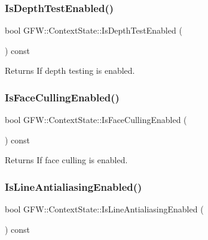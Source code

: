\subsubsection{\texorpdfstring{Is\+Depth\+Test\+Enabled()}{IsDepthTestEnabled()}}
{\footnotesize\ttfamily bool G\+F\+W\+::\+Context\+State\+::\+Is\+Depth\+Test\+Enabled (\begin{DoxyParamCaption}{ }\end{DoxyParamCaption}) const}

\begin{DoxyReturn}{Returns}
If depth testing is enabled. 
\end{DoxyReturn}
\mbox{\label{class_g_f_w_1_1_context_state_a805c41d30f739fd1a92a13fabe31aad4}} 
\subsubsection{\texorpdfstring{Is\+Face\+Culling\+Enabled()}{IsFaceCullingEnabled()}}
{\footnotesize\ttfamily bool G\+F\+W\+::\+Context\+State\+::\+Is\+Face\+Culling\+Enabled (\begin{DoxyParamCaption}{ }\end{DoxyParamCaption}) const}

\begin{DoxyReturn}{Returns}
If face culling is enabled. 
\end{DoxyReturn}
\mbox{\label{class_g_f_w_1_1_context_state_aeb3c3a071d43c86e5799562f847c432a}} 
\subsubsection{\texorpdfstring{Is\+Line\+Antialiasing\+Enabled()}{IsLineAntialiasingEnabled()}}
{\footnotesize\ttfamily bool G\+F\+W\+::\+Context\+State\+::\+Is\+Line\+Antialiasing\+Enabled (\begin{DoxyParamCaption}{ }\end{DoxyParamCaption}) const}

